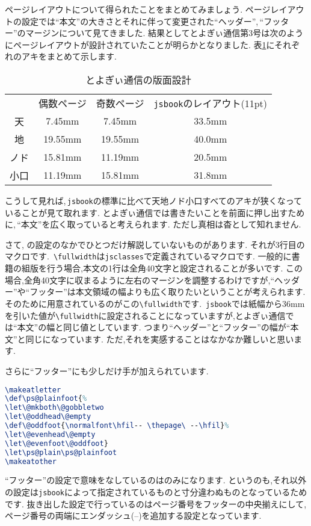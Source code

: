 ページレイアウトについて得られたことをまとめてみましょう.
ページレイアウトの設定では``本文''の大きさとそれに伴って変更された``ヘッダー'',\,``フッター''のマージンについて見てきました.
結果としてとよぎぃ通信第3号は次のようにページレイアウトが設計されていたことが明らかとなりました.
表\ref{tbl:toyogylayout}にそれぞれのアキをまとめて示します.

\begin{table}[!ht]
	\centering
	\caption{とよぎぃ通信の版面設計}
	\label{tbl:toyogylayout}
	\begin{tabular}{c|cc|c} \hline \hline
		& 偶数ページ & 奇数ページ & \verb|jsbook|のレイアウト(11pt) \\
		天 & 7.45mm & 7.45mm & 33.5mm \\
		地 & 19.55mm & 19.55mm & 40.0mm \\
		ノド & 15.81mm & 11.19mm & 20.5mm \\
		小口 & 11.19mm & 15.81mm & 31.8mm \\ \hline
	\end{tabular}
\end{table}

こうして見れば,\,\verb|jsbook|の標準に比べて天地ノド小口すべてのアキが狭くなっていることが見て取れます.
とよぎぃ通信では書きたいことを前面に押し出すために,\,``本文''を広く取っていると考えられます.
ただし真相は杳として知れません.

さて, の設定のなかでひとつだけ解説していないものがあります.
それが3行目のマクロです.\,
\verb|\fullwidth|は\verb|jsclasses|で定義されているマクロです.
一般的に書籍の組版を行う場合,本文の1行は全角40文字と設定されることが多いです.
この場合,全角40文字に収まるように左右のマージンを調整するわけですが,``ヘッダー''や``フッター''は本文領域の幅よりも広く取りたいということが考えられます.
そのために用意されているのがこの\verb|\fullwidth|です.\,
\verb|jsbook|では紙幅から36mmを引いた値が\verb|\fullwidth|に設定されることになっていますが,とよぎぃ通信では``本文''の幅と同じ値としています.
つまり``ヘッダー''と``フッター''の幅が``本文''と同じになっています.
ただ,それを実感することはなかなか難しいと思います.

さらに``フッター''にも少しだけ手が加えられています.
\begin{lstlisting}[caption = ``フッター''の設定, label = list:footer, language=tex]
\makeatletter
\def\ps@plainfoot{%
\let\@mkboth\@gobbletwo
\let\@oddhead\@empty
\def\@oddfoot{\normalfont\hfil-- \thepage\ --\hfil}%
\let\@evenhead\@empty
\let\@evenfoot\@oddfoot}
\let\ps@plain\ps@plainfoot
\makeatother
\end{lstlisting}
``フッター''の設定で意味をなしているのは\texttt{\def\@oddfoot{\normalfont\hfil-- \thepage\ --\hfil}}のみになります.
というのも,それ以外の設定は\texttt{jsbook}によって指定されているものと寸分違わぬものとなっているためです.
抜き出した設定で行っているのはページ番号をフッターの中央揃えにして,ページ番号の両端にエンダッシュ(--)を追加する設定となっています.

